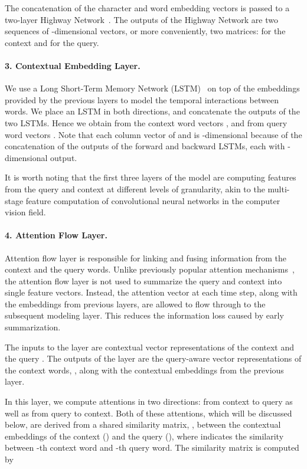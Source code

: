 \documentclass{article} \usepackage{iclr2017_conference,times}
\begin{document}
The concatenation of the character and word embedding vectors is passed to a two-layer Highway Network~\citep{highway}. 
The outputs of the Highway Network are two sequences of -dimensional vectors, or more conveniently, two matrices:  for the context and  for the query.

\paragraph{3. Contextual Embedding Layer.}\label{subsec:pre}
We use a Long Short-Term Memory Network (LSTM)~\citep{lstm} on top of the embeddings provided by the previous layers to model the temporal interactions between words. We place an LSTM in both directions, and concatenate the outputs of the two LSTMs. Hence we obtain  from the context word vectors , and  from query word vectors .
Note that each column vector of  and  is -dimensional because of the concatenation of the outputs of the forward and backward LSTMs, each with -dimensional output.

It is worth noting that the first three layers of the model are computing features from the query and context at different levels of granularity, akin to the multi-stage feature computation of convolutional neural networks in the computer vision field.

\paragraph{4. Attention Flow Layer.}\label{subsec:att}
Attention flow layer is responsible for linking and fusing information from the context and the query words. 
Unlike previously popular attention mechanisms~\citep{memnn,hill2015goldilocks,iterative,reasonet}, the attention flow layer is not used to summarize the query and context into single feature vectors. 
Instead, the attention vector at each time step, along with the embeddings from previous layers, are allowed to flow through to the subsequent modeling layer. 
This reduces the information loss caused by early summarization.
 
The inputs to the layer are contextual vector representations of the context  and the query . 
The outputs of the layer are the query-aware vector representations of the context words, , along with the contextual embeddings from the previous layer.

In this layer, we compute attentions in two directions: from context to query as well as from query to context. 
Both of these attentions, which will be discussed below, are derived from a shared similarity matrix, , between the contextual embeddings of the context () and the query (), 
where  indicates the similarity between -th context word and -th query word.
The similarity matrix is computed by
\end{document}
